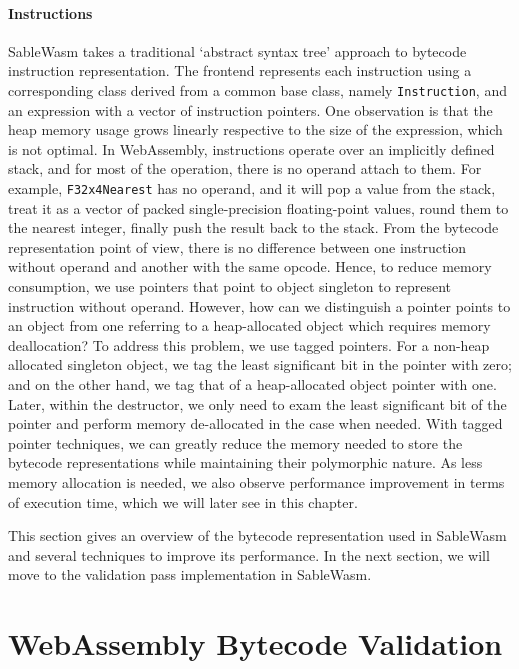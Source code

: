 \paragraph{Instructions} SableWasm takes a traditional `abstract syntax tree' approach to bytecode instruction representation. The frontend represents each instruction using a corresponding class derived from a common base class, namely \texttt{Instruction}, and an expression with a vector of instruction pointers. One observation is that the heap memory usage grows linearly respective to the size of the expression, which is not optimal. In WebAssembly, instructions operate over an implicitly defined stack, and for most of the operation, there is no operand attach to them. For example, \texttt{F32x4Nearest} has no operand, and it will pop a value from the stack, treat it as a vector of packed single-precision floating-point values, round them to the nearest integer, finally push the result back to the stack. From the bytecode representation point of view, there is no difference between one instruction without operand and another with the same opcode. Hence, to reduce memory consumption, we use pointers that point to object singleton to represent instruction without operand. However, how can we distinguish a pointer points to an object from one referring to a heap-allocated object which requires memory deallocation? To address this problem, we use tagged pointers. For a non-heap allocated singleton object, we tag the least significant bit in the pointer with zero; and on the other hand, we tag that of a heap-allocated object pointer with one. Later, within the destructor, we only need to exam the least significant bit of the pointer and perform memory de-allocated in the case when needed. With tagged pointer techniques, we can greatly reduce the memory needed to store the bytecode representations while maintaining their polymorphic nature. As less memory allocation is needed, we also observe performance improvement in terms of execution time, which we will later see in this chapter.

This section gives an overview of the bytecode representation used in SableWasm and several techniques to improve its performance. In the next section, we will move to the validation pass implementation in SableWasm.

\section{WebAssembly Bytecode Validation}


